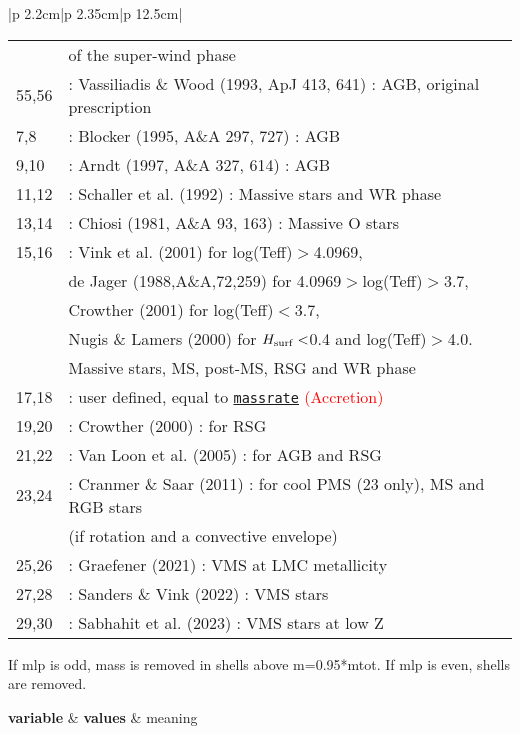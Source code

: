 \documentclass[10pt]{article}
\newcommand{\HPL}[1]{\hyperlink{#1}{\texttt{#1}}}
\newcommand{\LA}[1]{\textcolor{red}{#1}}
\begin{document}
\begin{center}
\begin{longtable}{|p {2.2cm}|p {2.35cm}|p {12.5cm}|}
\begin{tabular}{ll}
       & \hspace{0.2cm} of the super-wind phase\\
 55,56   & : Vassiliadis \& Wood (1993, ApJ 413, 641) : AGB, original prescription\\
 7,8   & : Blocker (1995, A\&A 297, 727) : AGB\\
 9,10  & : Arndt (1997, A\&A 327, 614) : AGB \\
 11,12 & : Schaller et al. (1992) : Massive stars and WR phase \\
 13,14 & : Chiosi (1981, A\&A 93, 163) : Massive O stars \\
 15,16 & : Vink et al. (2001) for log(Teff)$>$4.0969, \\
       & \hspace{0.2cm} de Jager (1988,A\&A,72,259) for 4.0969$>$log(Teff)$>$3.7, \\
       & \hspace{0.2cm} Crowther (2001) for log(Teff)$<$3.7, \\
       & \hspace{0.2cm} Nugis \& Lamers (2000) for $H_{\rm surf}<$0.4 and log(Teff)$>$4.0. \\
       & \hspace{0.2cm} Massive stars, MS, post-MS, RSG and WR phase \\
 17,18 & : user defined, equal to \HPL{massrate} \LA{(Accretion)} \\
 19,20 & : Crowther (2000) : for RSG \\
 21,22 & : Van Loon et al. (2005) : for AGB and RSG \\
 23,24 & : Cranmer \& Saar (2011) : for cool PMS (23 only), MS and RGB stars \\
       & \hspace{0.2cm} (if rotation and a convective envelope) \\
 25,26 & : Graefener (2021) : VMS at LMC metallicity \\
 27,28 & : Sanders \& Vink (2022) : VMS stars \\
 29,30 & : Sabhahit et al. (2023) : VMS stars at low Z \\
\end{tabular}
 If mlp is odd, mass is removed in shells above m=0.95*mtot.
 If mlp is even, shells are removed.
\\ \hline

\newpage
\hline \textbf{variable} & \textbf{values} & meaning \\ \hline\hline \hline


\end{longtable}
\end{center}
\end{document}
